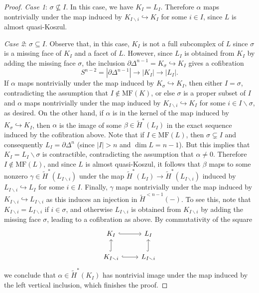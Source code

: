 \documentclass[a4paper,10pt]{amsart}
\theoremstyle{definition}
\theoremstyle{remark}
\begin{document}
\begin{proof}
\emph{Case 1}: $\sigma \not\subseteq I$. In this case, we have $K_I=L_I$. Therefore $\alpha$ maps nontrivially under the map induced by $K_{I\smallsetminus i} \hookrightarrow K_I$ for some $i\in I$, since $L$ is almost quasi-Koszul.

\emph{Case 2}: $\sigma \subseteq I$. Observe that, in this case, $K_I$ is not a full subcomplex of $L$ since $\sigma$ is a missing face of $K_I$ and a facet of $L$. However, since $L_I$ is obtained from $K_I$ by adding the missing face $\sigma$, the inclusion $\partial\Delta^{n-1}=K_\sigma \hookrightarrow K_I$ gives a cofibration
\[ S^{n-2} = |\partial\Delta^{n-1}| \longrightarrow |K_I| \longrightarrow |L_I|. \]
If $\alpha$ maps nontrivially under the map induced by $K_\sigma \hookrightarrow K_I$, then either $I=\sigma$, contradicting the assumption that $I\notin \mathrm{MF}(K)$, or else $\sigma$ is a proper subset of $I$ and $\alpha$ maps nontrivially under the map induced by $K_{I\smallsetminus i} \hookrightarrow K_I$ for some $i\in I\smallsetminus \sigma$, as desired. On the other hand, if $\alpha$ is in the kernel of the map induced by $K_\sigma \hookrightarrow K_I$, then $\alpha$ is the image of some $\beta\in \widetilde{H}^*(L_I)$ in the exact sequence induced by the cofibration above. Note that if $I\in \mathrm{MF}(L)$, then $\sigma \subsetneq I$ and consequently $L_I=\partial\Delta^n$ (since $|I|>n$ and $\dim L=n-1$). But this implies that $K_I=L_I\smallsetminus\sigma$ is contractible, contradicting the assumption that $\alpha\neq 0$. Therefore $I\notin \mathrm{MF}(L)$, and since $L$ is almost quasi-Koszul, it follows that $\beta$ maps to some nonzero $\gamma\in \widetilde{H}^*(L_{I\smallsetminus i})$ under the map $\widetilde{H}^*(L_I) \to \widetilde{H}^*(L_{I\smallsetminus i})$ induced by $L_{I\smallsetminus i} \hookrightarrow L_I$ for some $i\in I$. Finally, $\gamma$ maps nontrivially under the map induced by $K_{I\smallsetminus i} \hookrightarrow L_{I\smallsetminus i}$ as this induces an injection in $\widetilde{H}^{<n-1}(-)$. To see this, note that $K_{I\smallsetminus i}=L_{I\smallsetminus i}$ if $i\in \sigma$, and otherwise $L_{I\smallsetminus i}$ is obtained from $K_{I\smallsetminus i}$ by adding the missing face $\sigma$, leading to a cofibration as above. By commutativity of the square
\[
\begin{tikzcd}
K_I \ar[r,hook] & L_I \\
K_{I\smallsetminus i} \ar[u,hook] \ar[r,hook] & L_{I\smallsetminus i} \ar[u,hook]
\end{tikzcd}
\]
we conclude that $\alpha\in \widetilde{H}^*(K_I)$ has nontrivial image under the map induced by the left vertical inclusion, which finishes the proof.
\end{proof}
\end{document}
